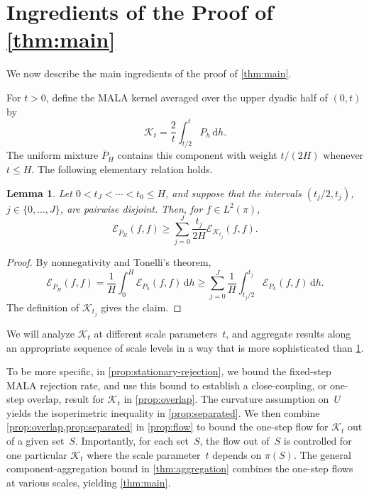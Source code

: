 \documentclass[11pt]{article}
\newtheorem{lemma}[lemma]{Lemma}
\newcommand{\cE}{\mathcal E}
\newcommand{\cK}{\mathcal K}
\newcommand{\1}{\mathbf 1}
\newcommand{\df}{\mathrm{d}}
\begin{document}
	
	
	
	\section{Ingredients of the Proof of \cref{thm:main}} \label{sec:ingredients}
	
	We now describe the main ingredients of the proof of \cref{thm:main}.
	
	
	
	For \(t>0\), define the MALA kernel averaged over the upper dyadic half of
	\((0,t)\) by
	\begin{equation*}
		\cK_t=\frac2t\int_{t/2}^tP_h\,\df h.
	\end{equation*}
	The uniform mixture $\overline P_H$ contains this component with weight \(t/(2H)\)
	whenever \(t\leq H\).
	The following elementary relation holds.
	
	\begin{lemma} \label{lem:Kt}
		Let \(0<t_J<\cdots<t_0\leq H\), and suppose that the intervals
		$(t_j/2,t_j)$, $j\in\{0,\dots,J\}$, are pairwise disjoint.
		Then, for $f \in L^2(\pi)$,
		\[
		\cE_{\overline P_H}(f,f) \geq \sum_{j=0}^J \frac{t_j}{2H} \cE_{\cK_{t_j}}(f,f).
		\]
	\end{lemma}
	
	\begin{proof}
		By nonnegativity and Tonelli's theorem,
		\[
		\cE_{\overline P_H}(f,f)
		=\frac1H\int_0^H\cE_{P_h}(f,f)\,\df h
		\geq\sum_{j=0}^J\frac1H
		\int_{t_j/2}^{t_j}\cE_{P_h}(f,f)\,\df h.
		\]
		The definition of $\cK_{t_j}$ gives the claim.
	\end{proof}
	
	We will analyze $\cK_t$ at different scale parameters~$t$, and aggregate results along an appropriate sequence of scale levels in a way that is more sophisticated than \cref{lem:Kt}.
	
	To be more specific, in \cref{prop:stationary-rejection}, we bound the fixed-step MALA rejection rate, and use
	this bound to establish a close-coupling, or one-step overlap, result for $\cK_t$ in \cref{prop:overlap}.
	The curvature assumption on~$U$ yields the isoperimetric inequality in
	\cref{prop:separated}.  We then combine \cref{prop:overlap,prop:separated} in
	\cref{prop:flow} to bound the one-step flow for $\cK_t$ out of a given set~$S$.
	Importantly, for each set~$S$, the flow out of~$S$ is controlled for one particular $\cK_t$ where the scale parameter~$t$ depends on $\pi(S)$.
	The general component-aggregation bound in
	\cref{thm:aggregation} combines the one-step flows at various scales, yielding \cref{thm:main}.
	
\end{document}
